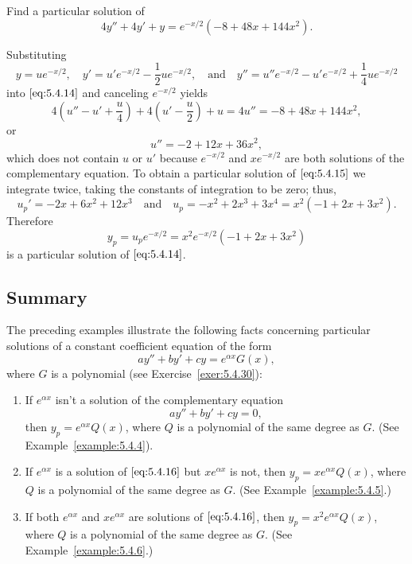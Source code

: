 \documentclass{ximera}
\begin{document}
\begin{example}\label{example:5.4.6}
Find a particular solution of
\begin{equation} \label{eq:5.4.14}
4y''+4y'+y=e^{-x/2}(-8+48x+144x^2).
\end{equation}
 
 
\begin{explanation}  Substituting
$$
y=ue^{-x/2},\quad  y'=u'e^{-x/2}-\frac{1}{2}ue^{-x/2},\quad\mbox{and}\quad y''=u''e^{-x/2}-u'e^{-x/2}+\frac{1}{4}ue^{-x/2}
$$
into $\eqref{eq:5.4.14}$ and  canceling $e^{-x/2}$  yields
$$
4\left(u''-u'+\frac{u}{4}\right)+4\left(u'-\frac{u}{2}\right)+u=4u''=-8+48x+144x^2,
$$
or
\begin{equation} \label{eq:5.4.15}
u''=-2+12x+36x^2,
\end{equation}
which does not contain $u$ or $u'$ because $e^{-x/2}$ and $xe^{-x/2}$
are both solutions of the complementary equation.
To obtain a particular solution of
$\eqref{eq:5.4.15}$ we integrate twice, taking the constants of integration
to be zero;   thus,
$$
u_p'=-2x+6x^2+12x^3\quad\mbox{and}\quad
u_p=-x^2+2x^3+3x^4=x^2(-1+2x+3x^2).
$$
Therefore
$$
y_p=u_pe^{-x/2}=x^2e^{-x/2}(-1+2x+3x^2)
$$
is a particular solution of  $\eqref{eq:5.4.14}$.
\end{explanation}
\end{example}
 
\subsection*{Summary}
 
The preceding examples illustrate the following facts concerning
 particular solutions of a constant coefficient equation of the form
$$
ay''+by'+cy=e^{\alpha x}G(x),
$$
where $G$ is a polynomial
(see Exercise~\ref{exer:5.4.30}):
\begin{enumerate}
\item\label{item:partsolutionfactsa} %
If $e^{\alpha x}$ isn't  a solution of the complementary
equation
\begin{equation} \label{eq:5.4.16}
ay''+by'+cy=0,
\end{equation}
then  $y_p=e^{\alpha x}Q(x)$,
 where $Q$ is a polynomial of the same degree as $G$.
(See Example~\ref{example:5.4.4}).
\item\label{item:partsolutionfactsb} %
If $e^{\alpha x}$ is a solution of $\eqref{eq:5.4.16}$ but $xe^{\alpha x}$
is not, then  $y_p=xe^{\alpha x}Q(x)$,
 where $Q$ is a polynomial of the same degree as $G$.
(See Example~\ref{example:5.4.5}.)
\item\label{item:partsolutionfactsc} %
If both $e^{\alpha x}$ and $xe^{\alpha x}$ are solutions of $\eqref{eq:5.4.16}$,
then  $y_p=x^2e^{\alpha x}Q(x)$,
 where $Q$ is a polynomial of the same degree as $G$.
(See Example~\ref{example:5.4.6}.)
\end{enumerate}
 
\end{document}
